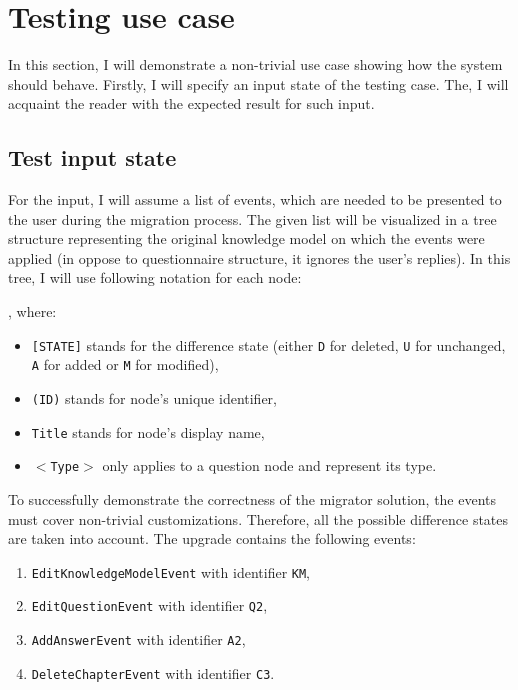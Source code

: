 \section{Testing use case}\label{sec:testing-use-case}

In this section, I will demonstrate a non-trivial use case showing how the system should behave.
Firstly, I will specify an input state of the testing case.
The, I will acquaint the reader with the expected result for such input.

\subsection{Test input state}

For the input, I will assume a list of events, which are needed to be presented to the user during the migration process.
The given list will be visualized in a tree structure representing the original knowledge model on which the events were applied (in oppose to questionnaire structure, it ignores the user's replies).
In this tree, I will use following notation for each node:

\begin{center}
\end{center}

, where:

\begin{itemize}
    \item \texttt{[STATE]} stands for the difference state (either \texttt{D} for deleted, \texttt{U} for unchanged, \texttt{A} for added or \texttt{M} for modified),
    \item \texttt{(ID)} stands for node's unique identifier,
    \item \texttt{Title} stands for node's display name,
    \item \texttt{$<$Type$>$} only applies to a question node and represent its type. 
\end{itemize}

To successfully demonstrate the correctness of the migrator solution, the events must cover non-trivial customizations.
Therefore, all the possible difference states are taken into account.
The upgrade contains the following events:

\begin{enumerate}
    \item \texttt{EditKnowledgeModelEvent} with identifier \texttt{KM},
    \item \texttt{EditQuestionEvent} with identifier \texttt{Q2},
    \item \texttt{AddAnswerEvent} with identifier \texttt{A2},
    \item \texttt{DeleteChapterEvent} with identifier \texttt{C3}.
\end{enumerate}


